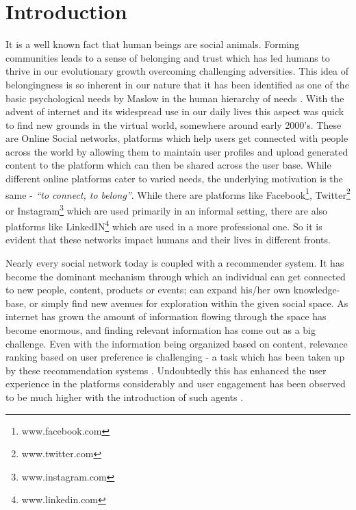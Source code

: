 \chapter{Introduction}
\label{introduction}
\thispagestyle{empty}

It is a well known fact that human beings are social animals. Forming communities leads to a sense of belonging and trust which has led humans to thrive in our evolutionary growth overcoming challenging adversities. This idea of belongingness is so inherent in our nature that it has been identified as one of the basic psychological needs by Maslow in the human hierarchy of needs \cite{maslow1958dynamic}. With the advent of internet and its widespread use in our daily lives this aspect was quick to find new grounds in the virtual world, somewhere around early 2000's. These are Online Social networks, platforms which help users get connected with people across the world by allowing them to maintain user profiles and upload generated content to the platform which can then be shared across the user base. While different online platforms cater to varied needs, the underlying motivation is the same - \textit{``to connect, to belong''}. While there are platforms like Facebook\footnote{www.facebook.com}, Twitter\footnote{www.twitter.com} or Instagram\footnote{www.instagram.com} which are used primarily in an informal setting, there are also platforms like LinkedIN\footnote{www.linkedin.com} which are used in a more professional one. So it is evident that these networks impact humans and their lives in different fronts.

Nearly every social network today is coupled with a recommender system. It has become the dominant mechanism through which an individual can get connected to new people, content, products or events; can expand his/her own knowledge-base, or simply find new avenues for exploration within the given social space. As internet has grown the amount of information flowing through the space has become enormous, and finding relevant information has come out as a big challenge. Even with the information being organized based on content, relevance ranking based on user preference is challenging - a task which has been taken up by these recommendation systems \cite{rashid2002getting}. Undoubtedly this has enhanced the user experience in the platforms considerably and user engagement has been observed to be much higher with the introduction of such agents \cite{pu2011user, konstan2012recommender}.

